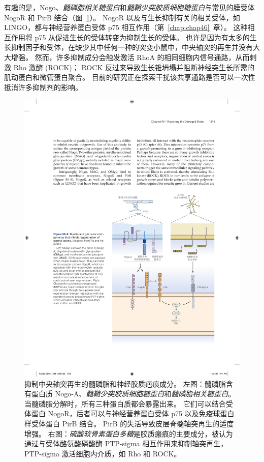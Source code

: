 有趣的是，Nogo、\textit{髓磷脂相关糖蛋白}和\textit{髓鞘少突胶质细胞糖蛋白}与常见的膜受体 NogoR 和 PirB 结合（图~\ref{fig:50_8}）。
NogoR 以及与生长抑制有关的相关受体，如 LINGO，都与神经营养蛋白受体 p75 相互作用（第~\ref{chap:chap46}~章）。
这种相互作用将 p75 从促进生长的受体转变为抑制生长的受体。
也许是因为有太多的生长抑制因子和受体，在缺少其中任何一种的突变小鼠中，中央轴突的再生并没有大大增强。
然而，许多抑制成分会触发激活 RhoA 的相同细胞内信号通路，从而刺激 Rho 激酶 (ROCK)；
ROCK 反过来导致生长锥坍塌并阻断神经突生长所需的肌动蛋白和微管蛋白聚合。
目前的研究正在探索干扰该共享通路是否可以一次性抵消许多抑制剂的影响。


\begin{figure}[htbp]
	\centering
	\includegraphics[width=0.8\linewidth]{chap50/fig_50_8}
	\caption{抑制中央轴突再生的髓磷脂和神经胶质疤痕成分\cite{yiu2006glial}。
		左图：髓磷脂含有蛋白质 Nogo-A、\textit{髓鞘少突胶质细胞糖蛋白}和\textit{髓磷脂相关糖蛋白}。
		当髓磷脂分解时，所有三种蛋白质都会暴露出来。
		它们可以结合受体蛋白 NogoR，后者可以与神经营养蛋白受体 p75 以及免疫球蛋白样受体蛋白 PirB 结合。
		PirB 的失活导致皮层脊髓轴突再生的适度增强。
		右图：\textit{硫酸软骨素蛋白多糖}是胶质瘢痕的主要成分，被认为通过与受体酪氨酸磷酸酶 PTP-sigma 相互作用来抑制轴突再生，PTP-sigma 激活细胞内介质，如 Rho 和 ROCK。}
	\label{fig:50_8}
\end{figure}



